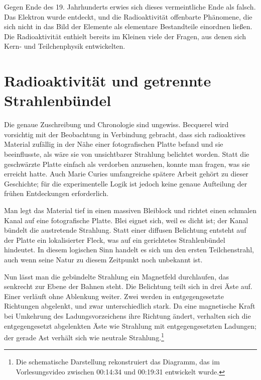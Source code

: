 Gegen Ende des 19. Jahrhunderts erwies sich dieses vermeintliche Ende als falsch. Das Elektron wurde entdeckt, und die Radioaktivität offenbarte Phänomene, die sich nicht in das Bild der Elemente als elementare Bestandteile einordnen ließen. Die Radioaktivität enthielt bereits im Kleinen viele der Fragen, aus denen sich Kern- und Teilchenphysik entwickelten.

\section{Radioaktivität und getrennte Strahlenbündel}

Die genaue Zuschreibung und Chronologie sind ungewiss. Becquerel wird vorsichtig mit der Beobachtung in Verbindung gebracht, dass sich radioaktives Material zufällig in der Nähe einer fotografischen Platte befand und sie beeinflusste, als wäre sie von unsichtbarer Strahlung belichtet worden. Statt die geschwärzte Platte einfach als verdorben anzusehen, konnte man fragen, was sie erreicht hatte. Auch Marie Curies umfangreiche spätere Arbeit gehört zu dieser Geschichte; für die experimentelle Logik ist jedoch keine genaue Aufteilung der frühen Entdeckungen erforderlich.

Man legt das Material tief in einen massiven Bleiblock und richtet einen schmalen Kanal auf eine fotografische Platte. Blei eignet sich, weil es dicht ist; der Kanal bündelt die austretende Strahlung. Statt einer diffusen Belichtung entsteht auf der Platte ein lokalisierter Fleck, was auf ein gerichtetes Strahlenbündel hindeutet. In diesem logischen Sinn handelt es sich um den ersten Teilchenstrahl, auch wenn seine Natur zu diesem Zeitpunkt noch unbekannt ist.

Nun lässt man die gebündelte Strahlung ein Magnetfeld durchlaufen, das senkrecht zur Ebene der Bahnen steht. Die Belichtung teilt sich in drei Äste auf. Einer verläuft ohne Ablenkung weiter. Zwei werden in entgegengesetzte Richtungen abgelenkt, und zwar unterschiedlich stark. Da eine magnetische Kraft bei Umkehrung des Ladungsvorzeichens ihre Richtung ändert, verhalten sich die entgegengesetzt abgelenkten Äste wie Strahlung mit entgegengesetzten Ladungen; der gerade Ast verhält sich wie neutrale Strahlung.\footnote{Die schematische Darstellung rekonstruiert das Diagramm, das im Vorlesungsvideo zwischen 00:14:34 und 00:19:31 entwickelt wurde.}

